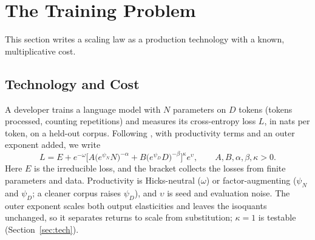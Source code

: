 
\section{The Training Problem}\label{sec:framework}

This section writes a scaling law as a production technology with a known, multiplicative cost.

\subsection{Technology and Cost}\label{sec:framework:tech}

A developer trains a language model with $N$ parameters on $D$ tokens (tokens processed, counting repetitions) and
measures its cross-entropy loss $L$, in nats per token, on a held-out corpus. Following \citet{hoffmann2022training},
with productivity terms and an outer exponent added, we write
\begin{equation}\label{eq:tech}
L=E+e^{-\omega}\Big[A\big(e^{\psi_N}N\big)^{-\alpha}+B\big(e^{\psi_D}D\big)^{-\beta}\Big]^{\kappa}e^{\upsilon},
\qquad A,B,\alpha,\beta,\kappa>0 .
\end{equation}
Here $E$ is the irreducible loss, and the bracket collects the losses from finite parameters and data.
Productivity is Hicks-neutral ($\omega$) or factor-augmenting ($\psi_N$ and $\psi_D$; a cleaner corpus raises $\psi_D$),
and $\upsilon$ is seed and evaluation noise. The outer
exponent scales both output elasticities and leaves the isoquants unchanged, so it separates returns to scale from
substitution; $\kappa=1$ is testable (Section~\ref{sec:tech}).


